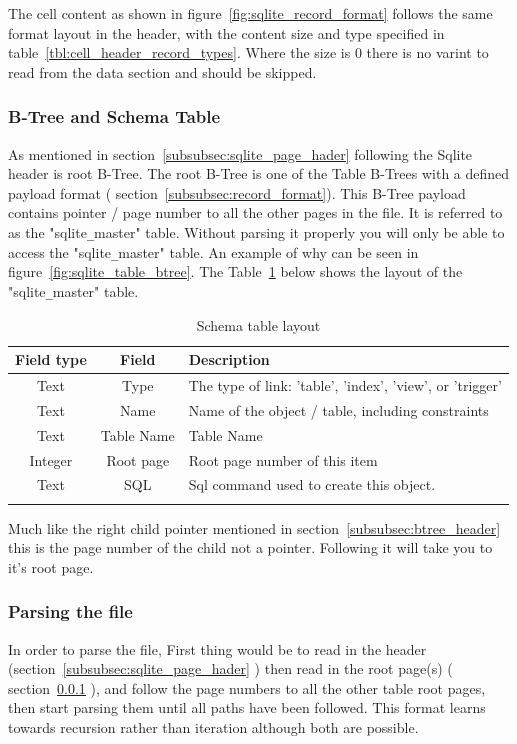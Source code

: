 The cell content as shown in figure~\ref{fig:sqlite_record_format} follows the same format layout in the header, with the content size and type specified in table~\ref{tbl:cell_header_record_types}. Where the size is 0 there is no varint to read from the data section and should be skipped.

\subsubsection{ B-Tree and Schema Table}
\label{subsubsec:schema_table}

As mentioned in section~\ref{subsubsec:sqlite_page_hader} following the Sqlite header is root B-Tree. The root B-Tree is one of the Table B-Trees with a defined payload format ( section~\ref{subsubsec:record_format}). This B-Tree payload contains pointer / page number to all the other pages in the file. It is referred to as the "sqlite\verb|_|master" table. Without parsing it properly you will only be able to access the "sqlite\verb|_|master" table. An example of why can be seen in figure~\ref{fig:sqlite_table_btree}. The Table~\ref{tbl:schema_table} below shows the layout of the "sqlite\verb|_|master" table.

\begin{longtable}[h]{| c | c| p{10cm} |}
		\hline
			\textbf{Field type} & \textbf{Field} & \textbf{Description} \\ 
		\hline
		\endhead
			Text & Type & The type of link: 'table', 'index', 'view', or 'trigger' \\
		\hline
			Text & Name & Name of the object / table, including constraints \\
		\hline
			Text & Table Name & Table Name \\
		\hline
			Integer & Root page & Root page number of this item \\
		\hline
			Text & SQL & Sql command used to create this object. \\
		\hline
	\caption{Schema table layout}
	\label{tbl:schema_table}
\end{longtable}

Much like the right child pointer mentioned in section~\ref{subsubsec:btree_header} this is the page number of the child not a pointer. Following it will take you to it's root page.


\subsubsection{Parsing the file}
\label{subsubsec:parsing the file}

In order to parse the file, First thing would be to read in the header (section~\ref{subsubsec:sqlite_page_hader} ) then read in the root page(s) ( section~\ref{subsubsec:schema_table} ), and follow the page numbers to all the other table root pages, then start parsing them until all paths have been followed. This format learns towards recursion rather than iteration although both are possible.
